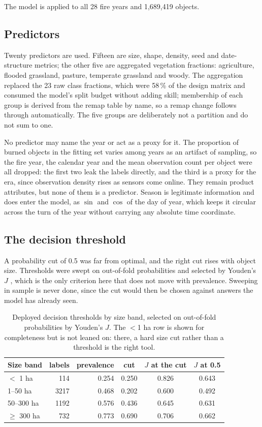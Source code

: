 \documentclass[11pt,a4paper]{article}
\begin{document}
The model is applied to all 28 fire years and 1,689,419 objects.

\subsection{Predictors}

Twenty predictors are used. Fifteen are size, shape, density, seed and date-structure metrics; the
other five are aggregated vegetation fractions: agriculture, flooded grassland, pasture, temperate
grassland and woody. The aggregation replaced the 23 raw class fractions, which were 58\,\% of the
design matrix and consumed the model's split budget without adding skill; membership of each group
is derived from the remap table by name, so a remap change follows through automatically. The five
groups are deliberately not a partition and do not sum to one.

No predictor may name the year or act as a proxy for it. The proportion of burned objects in the
fitting set varies among years as an artifact of sampling, so the fire year, the calendar year and
the mean observation count per object were all dropped: the first two leak the labels directly, and
the third is a proxy for the era, since observation density rises as sensors come online. They
remain product attributes, but none of them is a predictor. Season is legitimate information and
does enter the model, as \(\sin\) and \(\cos\) of the day of year, which keeps it circular across
the turn of the year without carrying any absolute time coordinate.

\subsection{The decision threshold}

A probability cut of 0.5 was far from optimal, and the right cut rises with object size. 
Thresholds were swept on
out-of-fold probabilities and selected by Youden's \(J\) \parencite{youden1950}, which is the only
criterion here that does not move with prevalence. Sweeping in sample is never done, since the cut
would then be chosen against answers the model has already seen.

\begin{table}[ht]
\centering
\caption{Deployed decision thresholds by size band, selected on out-of-fold probabilities by
Youden's \(J\). The \(<\)1 ha row is shown for completeness but is not leaned on: there, a hard
size cut rather than a threshold is the right tool.}
\label{tab-thresholds}
\begin{tabular}{l r r c c c}
\toprule
Size band & labels & prevalence & cut & \(J\) at the cut & \(J\) at 0.5 \\
\midrule
\(<\) 1 ha        & 114  & 0.254 & 0.250 & 0.826 & 0.643 \\
1--50 ha          & 3217 & 0.468 & 0.202 & 0.600 & 0.492 \\
50--300 ha        & 1192 & 0.576 & 0.436 & 0.645 & 0.631 \\
\(\ge\) 300 ha    & 732  & 0.773 & 0.690 & 0.706 & 0.662 \\
\bottomrule
\end{tabular}
\end{table}
\end{document}
